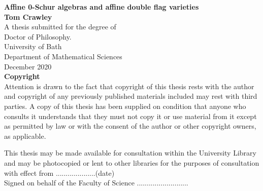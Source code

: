 \begin{titlepage}
\begin{center}
\vspace*{1cm}
\Huge
\textbf{Affine 0-Schur algebras and affine double flag varieties}\\
\vspace{0.7cm}
\Large
\textbf{Tom Crawley}\\
\vfill
A thesis submitted for the degree of\\
Doctor of Philosophy.\\
\vspace{0.7cm}
\large
University of Bath\\
Department of Mathematical Sciences\\
December 2020\\

\vspace{4.2cm}
\normalsize
\textbf{Copyright}\\
\vspace{0.7cm}
Attention is drawn to the fact that copyright of this thesis rests with the author and copyright of any previously published materials included may rest with third parties. A copy of this thesis has been supplied on condition that anyone who consults it understands that they must not copy it or use material from it except as permitted by law or with the consent of the author or other copyright owners, as applicable.\\
\vspace{0.7cm}

This thesis may be made available for consultation within the University Library and may be photocopied or lent to other libraries for the purposes of consultation with effect from ....................(date)\\
\vspace{0.7cm}
Signed on behalf of the Faculty of Science ..........................\\
\end{center}
\end{titlepage}